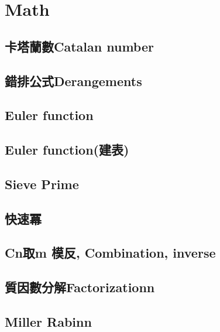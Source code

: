 \section{Math}

\subsection{卡塔蘭數Catalan number}


\subsection{錯排公式Derangements}


\subsection{Euler function}


\subsection{Euler function(建表)}


\subsection{Sieve Prime}


\subsection{快速冪}


\subsection{Cn取m 模反, Combination, inverse}


\subsection{質因數分解Factorizationn}


\subsection{Miller Rabinn}


